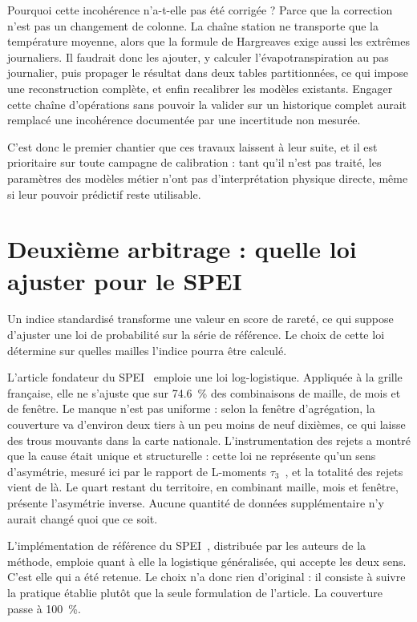 Pourquoi cette incohérence n'a-t-elle pas été corrigée ? Parce que la correction n'est pas un
changement de colonne. La chaîne station ne transporte que la température moyenne, alors que la
formule de Hargreaves exige aussi les extrêmes journaliers. Il faudrait donc les ajouter, y
calculer l'évapotranspiration au pas journalier, puis propager le résultat dans deux tables
partitionnées, ce qui impose une reconstruction complète, et enfin recalibrer les modèles
existants. Engager cette chaîne d'opérations sans pouvoir la valider sur un historique complet
aurait remplacé une incohérence documentée par une incertitude non mesurée.

C'est donc le premier chantier que ces travaux laissent à leur suite, et il est prioritaire sur
toute campagne de calibration : tant qu'il n'est pas traité, les paramètres des modèles métier
n'ont pas d'interprétation physique directe, même si leur pouvoir prédictif reste utilisable.

\section{Deuxième arbitrage : quelle loi ajuster pour le SPEI}
\label{sec:glo}

Un indice standardisé transforme une valeur en score de rareté, ce qui suppose d'ajuster une loi
de probabilité sur la série de référence. Le choix de cette loi détermine sur quelles mailles
l'indice pourra être calculé.

L'article fondateur du SPEI~\cite{vicenteserrano2010spei} emploie une loi log-logistique.
Appliquée à la grille française, elle ne s'ajuste que sur \SI{74,6}{\percent} des combinaisons de maille, de mois et de fenêtre. Le manque n'est pas
uniforme : selon la fenêtre d'agrégation, la couverture va d'environ deux tiers à un peu moins de
neuf dixièmes, ce qui laisse des trous mouvants dans la carte nationale. L'instrumentation
des rejets a montré que la cause était unique et structurelle : cette loi ne représente qu'un
sens d'asymétrie, mesuré ici par le rapport de L-moments $\tau_3$~\cite{hosking1990lmoments},
et la totalité des rejets vient de là. Le quart restant du territoire, en
combinant maille, mois et fenêtre, présente l'asymétrie inverse. Aucune quantité de données
supplémentaire n'y aurait changé quoi que ce soit.

L'implémentation de référence du SPEI~\cite{begueria_spei_package}, distribuée par les auteurs de
la méthode, emploie quant à elle la logistique généralisée, qui accepte les deux sens. C'est
elle qui a été retenue. Le choix n'a donc rien d'original : il consiste à suivre la pratique
établie plutôt que la seule formulation de l'article. La couverture passe à \SI{100}{\percent}.

